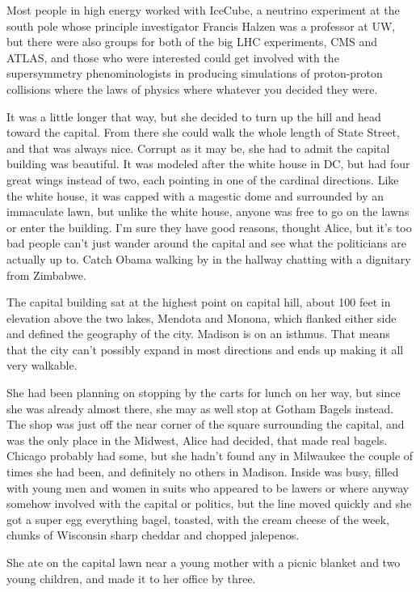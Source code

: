 Most people in high energy worked with IceCube, a neutrino experiment at the south pole whose principle investigator Francis Halzen was a professor at UW, but there were also groups for both of the big LHC experiments, CMS and ATLAS, and those who were interested could get involved with the supersymmetry phenominologists in producing simulations of proton-proton collisions where the laws of physics where whatever you decided they were.

\mypause

It was a little longer that way, but she decided to turn up the hill and head toward the capital. From there she could walk the whole length of State Street, and that was always nice. Corrupt as it may be, she had to admit the capital building was beautiful. It was modeled after the white house in DC, but had four great wings instead of two, each pointing in one of the cardinal directions. Like the white house, it was capped with a magestic dome and surrounded by an immaculate lawn, but unlike the white house, anyone was free to go on the lawns or enter the building. I'm sure they have good reasons, thought Alice, but it's too bad people can't just wander around the capital and see what the politicians are actually up to. Catch Obama walking by in the hallway chatting with a dignitary from Zimbabwe. 

The capital building sat at the highest point on capital hill, about 100 feet in elevation above the two lakes, Mendota and Monona, which flanked either side and defined the geography of the city. Madison is on an isthmus. That means that the city can't possibly expand in most directions and ends up making it all very walkable.

She had been planning on stopping by the carts for lunch on her way, but since she was already almost there, she may as well stop at Gotham Bagels instead. The shop was just off the near corner of the square surrounding the capital, and was the only place in the Midwest, Alice had decided, that made real bagels. Chicago probably had some, but she hadn't found any in Milwaukee the couple of times she had been, and definitely no others in Madison. Inside was busy, filled with young men and women in suits who appeared to be lawers or where anyway somehow involved with the capital or politics, but the line moved quickly and she got a super egg everything bagel, toasted, with the cream cheese of the week, chunks of Wisconsin sharp cheddar and chopped jalepenos. 

She ate on the capital lawn near a young mother with a picnic blanket and two young children, and made it to her office by three. 

